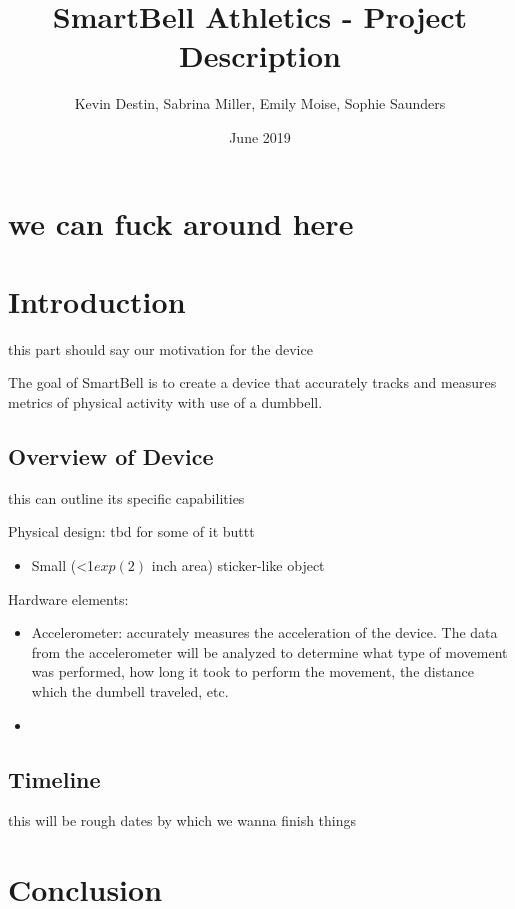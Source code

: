 \documentclass{article}
\title{SmartBell Athletics - Project Description}
\author{Kevin Destin, Sabrina Miller, Emily Moise, Sophie Saunders}
\date{June 2019}
\begin{document}
\maketitle

\section{we can fuck around here}











\section*{Introduction}
this part should say our motivation for the device 

The goal of SmartBell is to create a device that accurately tracks and measures metrics of physical activity with use of a dumbbell.

\subsection{Overview of Device}
this can outline its specific capabilities

Physical design:
tbd for some of it buttt 
\begin{itemize}
    \item Small (<1$exp(2)$ inch area) sticker-like object 
\end{itemize}

Hardware elements:
\begin{itemize}
    \item Accelerometer: accurately measures the acceleration of the device. The data from the accelerometer will be analyzed to determine what type of movement was performed, how long it took to perform the movement, the distance which the dumbell traveled, etc. 
    \item 
\end{itemize}


\subsection{Timeline}
this will be rough dates by which we wanna finish things

\section*{Conclusion}




\end{document}
